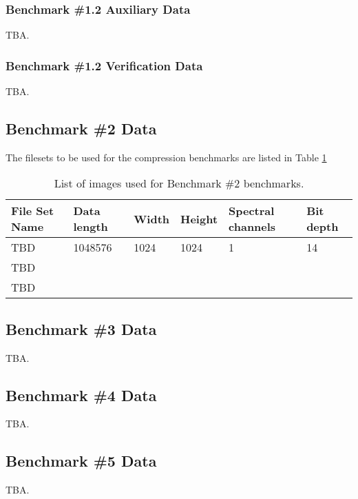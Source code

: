 \subsubsection{Benchmark \#1.2 Auxiliary Data}
TBA.

\subsubsection{Benchmark \#1.2 Verification Data}
TBA.

\subsection{Benchmark \#2 Data}

The filesets to be used for the compression benchmarks are listed in Table \ref{tab:compression_file_sets}

\begin{table}[!h]
    \centering
    \begin{tabular}{|l|l|l|l|l|l|}
        \hline
        File Set Name	 & Data length	& Width	    & Height	    & Spectral channels	    & Bit depth   \\ \hline
        \hline
        TBD         & 1048576	    & 1024	        & 1024	        & 1	                    & 14        \\ \hline
        TBD         &               &               &               &                       &           \\ \hline
        TBD         &               &               &               &                       &           \\ \hline
    \end{tabular}
    \caption{List of images used for Benchmark \#2 benchmarks.}
    \label{tab:compression_file_sets}
\end{table}

\subsection{Benchmark \#3 Data}
TBA.

\subsection{Benchmark \#4 Data}
TBA.

\subsection{Benchmark \#5 Data}
TBA.